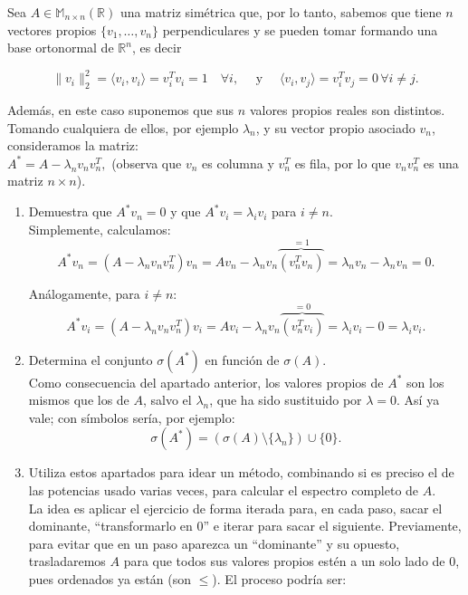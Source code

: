 \documentclass[12pt]{article}
\begin{document}
	\begin{ejercicio}[3 puntos]
		Sea $A \in \mathbb{M}_{n \times n}(\mathbb{R})$ una matriz simétrica que, por lo tanto, sabemos que tiene $n$ vectores propios $\{v_1, \dots, v_n\}$ perpendiculares y se pueden tomar formando una base ortonormal de $\mathbb{R}^n$, es decir
		
		$$\|v_i\|_2^2 = \langle v_i, v_i \rangle = v_i^T v_i = 1 \quad \forall i, \quad \text{ y } \quad \langle v_i, v_j \rangle = v_i^T v_j = 0 \, \forall i \neq j.$$
		
		Además, en este caso suponemos que sus $n$ valores propios reales son distintos. Tomando cualquiera de ellos, por ejemplo $\lambda_n$, y su vector propio asociado $v_n$, consideramos la matriz: \\
		
		$A^* = A - \lambda_n v_n v_n^T,$ (observa que $v_n$ es columna y $v_n^T$ es fila, por lo que $v_n v_n^T$ es una matriz $n \times n$).
		
		\begin{enumerate}[label=\alph*)]
			\item Demuestra que $A^* v_n = 0$ y que $A^* v_i = \lambda_i v_i$ para $i \neq n$. \\
				Simplemente, calculamos:
				$$A^* v_n = (A - \lambda_n v_n v_n^T) v_n = A v_n - \lambda_n v_n \overbrace{(v_n^T v_n)}^{=1} = \lambda_n v_n - \lambda_n v_n = 0.$$
				
				Análogamente, para $i \neq n$:
				$$A^* v_i = (A - \lambda_n v_n v_n^T) v_i = A v_i - \lambda_n v_n \overbrace{(v_n^T v_i)}^{=0} = \lambda_i v_i - 0 = \lambda_i v_i.$$
				
			\item Determina el conjunto $\sigma(A^*)$ en función de $\sigma(A)$. \\
			
				Como consecuencia del apartado anterior, los valores propios de $A^*$ son los mismos que los de $A$, salvo el $\lambda_n$, que ha sido sustituido por $\lambda = 0$. Así ya vale; con símbolos sería, por ejemplo:
				$$\sigma(A^*) = (\sigma(A) \setminus \{\lambda_n\}) \cup \{0\}.$$
				
			\item Utiliza estos apartados para idear un método, combinando si es preciso el de las potencias usado varias veces, para calcular el espectro completo de $A$. \\
			
				La idea es aplicar el ejercicio de forma iterada para, en cada paso, sacar el dominante, “transformarlo en 0” e iterar para sacar el siguiente. Previamente, para evitar que en un paso aparezca un “dominante” y su opuesto, trasladaremos $A$ para que todos sus valores propios estén a un solo lado de $0$, pues ordenados ya están (son $\leq$). El proceso podría ser:
				

\end{enumerate}
\end{ejercicio}
\end{document}
